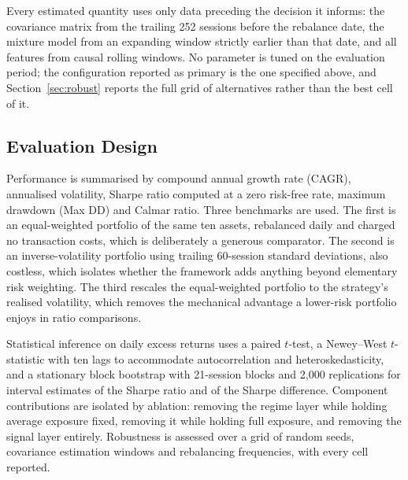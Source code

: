 Every estimated quantity uses only data preceding the decision it informs: the
covariance matrix from the trailing 252 sessions before the rebalance date, the mixture
model from an expanding window strictly earlier than that date, and all features from
causal rolling windows. No parameter is tuned on the evaluation period; the
configuration reported as primary is the one specified above, and
Section~\ref{sec:robust} reports the full grid of alternatives rather than the best
cell of it.

\subsection{Evaluation Design}

Performance is summarised by compound annual growth rate (CAGR), annualised
volatility, Sharpe ratio computed at a zero risk-free rate, maximum drawdown (Max DD)
and Calmar ratio. Three
benchmarks are used. The first is an equal-weighted portfolio of the same ten assets,
rebalanced daily and charged no transaction costs, which is deliberately a generous
comparator. The second is an inverse-volatility portfolio using trailing 60-session
standard deviations, also costless, which isolates whether the framework adds anything
beyond elementary risk weighting. The third rescales the equal-weighted portfolio to
the strategy's realised volatility, which removes the mechanical advantage a
lower-risk portfolio enjoys in ratio comparisons.

Statistical inference on daily excess returns uses a paired $t$-test, a Newey--West
$t$-statistic with ten lags to accommodate autocorrelation and heteroskedasticity, and
a stationary block bootstrap with 21-session blocks and 2{,}000 replications for
interval estimates of the Sharpe ratio and of the Sharpe difference. Component
contributions are isolated by ablation: removing the regime layer while holding average
exposure fixed, removing it while holding full exposure, and removing the signal layer
entirely. Robustness is assessed over a grid of random seeds, covariance estimation
windows and rebalancing frequencies, with every cell reported.
